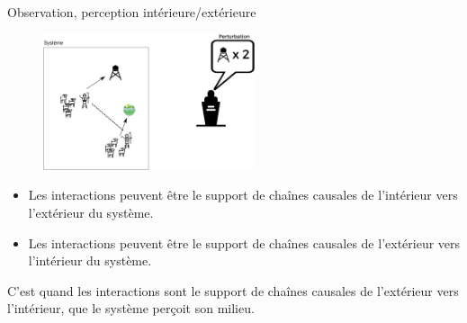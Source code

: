 \documentclass[newPxFont]{beamer}
\begin{document}
%
%
%

\begin{frame}[c]{Observation, perception intérieure/extérieure}
\vspace{-1cm}

\begin{figure}
  \includegraphics[height=4cm]{img/Systeme_perception.png}
\end{figure}
\begin{itemize}
  \item Les interactions peuvent être le support de chaînes causales de l’intérieur vers l’extérieur du système.
  \item Les interactions peuvent être le support de chaînes causales de l’extérieur vers l’intérieur du système.
\end{itemize}

C'est quand les interactions sont le support de chaînes causales de l’extérieur vers l’intérieur, que le système perçoit son milieu.

\end{frame}
\end{document}
